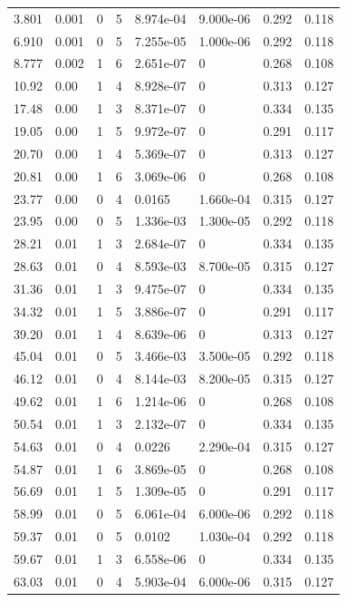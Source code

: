 \documentclass[preview]{standalone}
\begin{document}
{{\begin{tabular}{L{1.2cm}C{1.2cm} C{0.3cm}C{0.5cm} C{1.4cm}C{1.4cm} C{1.4cm}C{1.4cm}}
  3.801  &  0.001  & 0     &  5 &  8.974e-04  & 9.000e-06  & 0.292 &  0.118   \\ 
  6.910  &  0.001  & 0     &  5 &  7.255e-05  & 1.000e-06  & 0.292 &  0.118   \\ 
  8.777  &  0.002  & 1     &  6 &  2.651e-07  & 0  & 0.268 &  0.108   \\ 
  10.92  &  0.00  & 1     &  4 &  8.928e-07  & 0  & 0.313 &  0.127   \\ 
  17.48  &  0.00  & 1     &  3 &  8.371e-07  & 0  & 0.334 &  0.135   \\ 
  19.05  &  0.00  & 1     &  5 &  9.972e-07  & 0  & 0.291 &  0.117   \\ 
  20.70  &  0.00  & 1     &  4 &  5.369e-07  & 0  & 0.313 &  0.127   \\ 
  20.81  &  0.00  & 1     &  6 &  3.069e-06  & 0  & 0.268 &  0.108   \\ 
  23.77  &  0.00  & 0     &  4 &  0.0165  & 1.660e-04  & 0.315 &  0.127   \\ 
  23.95  &  0.00  & 0     &  5 &  1.336e-03  & 1.300e-05  & 0.292 &  0.118   \\ 
  28.21  &  0.01  & 1     &  3 &  2.684e-07  & 0  & 0.334 &  0.135   \\ 
  28.63  &  0.01  & 0     &  4 &  8.593e-03  & 8.700e-05  & 0.315 &  0.127   \\ 
  31.36  &  0.01  & 1     &  3 &  9.475e-07  & 0  & 0.334 &  0.135   \\ 
  34.32  &  0.01  & 1     &  5 &  3.886e-07  & 0  & 0.291 &  0.117   \\ 
  39.20  &  0.01  & 1     &  4 &  8.639e-06  & 0  & 0.313 &  0.127   \\ 
  45.04  &  0.01  & 0     &  5 &  3.466e-03  & 3.500e-05  & 0.292 &  0.118   \\ 
  46.12  &  0.01  & 0     &  4 &  8.144e-03  & 8.200e-05  & 0.315 &  0.127   \\ 
  49.62  &  0.01  & 1     &  6 &  1.214e-06  & 0  & 0.268 &  0.108   \\ 
  50.54  &  0.01  & 1     &  3 &  2.132e-07  & 0  & 0.334 &  0.135   \\ 
  54.63  &  0.01  & 0     &  4 &  0.0226  & 2.290e-04  & 0.315 &  0.127   \\ 
  54.87  &  0.01  & 1     &  6 &  3.869e-05  & 0  & 0.268 &  0.108   \\ 
  56.69  &  0.01  & 1     &  5 &  1.309e-05  & 0  & 0.291 &  0.117   \\ 
  58.99  &  0.01  & 0     &  5 &  6.061e-04  & 6.000e-06  & 0.292 &  0.118   \\ 
  59.37  &  0.01  & 0     &  5 &  0.0102  & 1.030e-04  & 0.292 &  0.118   \\ 
  59.67  &  0.01  & 1     &  3 &  6.558e-06  & 0  & 0.334 &  0.135   \\ 
  63.03  &  0.01  & 0     &  4 &  5.903e-04  & 6.000e-06  & 0.315 &  0.127   \\ 
\hline 
\end{tabular} 

}}
\end{document}
